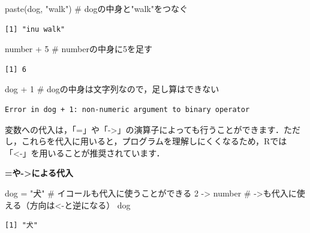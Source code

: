 \documentclass[
  letterpaper,
  DIV=11,
  numbers=noendperiod]{scrreprt}
\newenvironment{Shaded}{\begin{snugshade}}{\end{snugshade}}
\newcommand{\CommentTok}[1]{\textcolor[rgb]{0.37,0.37,0.37}{#1}}
\newcommand{\DecValTok}[1]{\textcolor[rgb]{0.68,0.00,0.00}{#1}}
\newcommand{\FunctionTok}[1]{\textcolor[rgb]{0.28,0.35,0.67}{#1}}
\newcommand{\NormalTok}[1]{\textcolor[rgb]{0.00,0.23,0.31}{#1}}
\newcommand{\OtherTok}[1]{\textcolor[rgb]{0.00,0.23,0.31}{#1}}
\newcommand{\SpecialCharTok}[1]{\textcolor[rgb]{0.37,0.37,0.37}{#1}}
\newcommand{\StringTok}[1]{\textcolor[rgb]{0.13,0.47,0.30}{#1}}
\begin{document}
\begin{Shaded}
\begin{Highlighting}[]
\FunctionTok{paste}\NormalTok{(dog, }\StringTok{"walk"}\NormalTok{) }\CommentTok{\# dogの中身と"walk"をつなぐ}
\end{Highlighting}
\end{Shaded}

\begin{verbatim}
[1] "inu walk"
\end{verbatim}

\begin{Shaded}
\begin{Highlighting}[]
\NormalTok{number }\SpecialCharTok{+} \DecValTok{5} \CommentTok{\# numberの中身に5を足す}
\end{Highlighting}
\end{Shaded}

\begin{verbatim}
[1] 6
\end{verbatim}

\begin{Shaded}
\begin{Highlighting}[]
\NormalTok{dog }\SpecialCharTok{+} \DecValTok{1} \CommentTok{\# dogの中身は文字列なので，足し算はできない}
\end{Highlighting}
\end{Shaded}

\begin{verbatim}
Error in dog + 1: non-numeric argument to binary operator
\end{verbatim}

変数への代入は，「=」や「-\textgreater」の演算子によっても行うことができます．ただし，これらを代入に用いると，プログラムを理解しにくくなるため，Rでは「\textless-」を用いることが推奨されています．

\textbf{=や-\textgreater による代入}

\begin{Shaded}
\begin{Highlighting}[]
\NormalTok{dog }\OtherTok{=} \StringTok{"犬"} \CommentTok{\# イコールも代入に使うことができる}
\DecValTok{2} \OtherTok{{-}\textgreater{}}\NormalTok{ number }\CommentTok{\# {-}\textgreater{}も代入に使える（方向は\textless{}{-}と逆になる）}
\NormalTok{dog}
\end{Highlighting}
\end{Shaded}

\begin{verbatim}
[1] "犬"
\end{verbatim}
\end{document}
